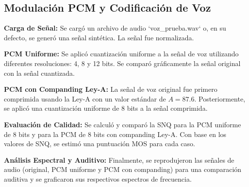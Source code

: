 \documentclass[journal]{IEEEtran} %
\begin{document}
\subsection{Modulación PCM y Codificación de Voz}

\textbf{Carga de Señal:} Se cargó un archivo de audio `voz\_prueba.wav` o, en su defecto, se generó una señal sintética. La señal fue normalizada.

\textbf{PCM Uniforme:} Se aplicó cuantización uniforme a la señal de voz utilizando diferentes resoluciones: 4, 8 y 12 bits. Se comparó gráficamente la señal original con la señal cuantizada.

\textbf{PCM con Companding Ley-A:} La señal de voz original fue primero comprimida usando la Ley-A con un valor estándar de $A=87.6$. Posteriormente, se aplicó una cuantización uniforme de 8 bits a la señal comprimida.

\textbf{Evaluación de Calidad:} Se calculó y comparó la SNQ para la PCM uniforme de 8 bits y para la PCM de 8 bits con companding Ley-A. Con base en los valores de SNQ, se estimó una puntuación MOS para cada caso.

\textbf{Análisis Espectral y Auditivo:} Finalmente, se reprodujeron las señales de audio (original, PCM uniforme y PCM con companding) para una comparación auditiva y se graficaron sus respectivos espectros de frecuencia.



\end{document}
